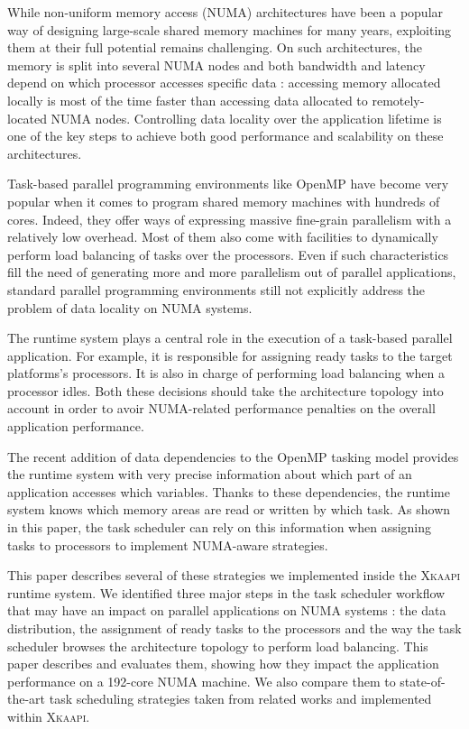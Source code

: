 \documentclass{Styles/llncs}
\newcommand{\kaapi}{\textsc{\mbox{Xkaapi}}\xspace}
\begin{document}
While non-uniform memory access (NUMA) architectures have been a popular way of designing large-scale shared memory machines for many years, exploiting them at their full potential remains challenging.
On such architectures, the memory is split into several NUMA nodes and
both bandwidth and latency depend on which processor accesses specific data :
accessing memory allocated locally is most of the time faster than accessing data allocated to remotely-located NUMA nodes.
Controlling data locality over the application lifetime is one of the key steps to
achieve both good performance and scalability on these architectures.

Task-based parallel programming environments like OpenMP have become very popular when it comes to program shared memory machines with hundreds of cores. Indeed, they offer ways of expressing massive fine-grain parallelism with a relatively low overhead. Most of them also come with facilities to dynamically perform load balancing of tasks over the processors. Even if such characteristics fill the need of generating more and more parallelism out of parallel applications, standard parallel programming environments still not explicitly address the problem of data locality on NUMA systems.

The runtime system plays a central role in the execution of a task-based parallel application.
For example, it is responsible for assigning ready tasks to the target platforms's processors. 
It is also in charge of performing load balancing when a processor idles.
Both these decisions should take the architecture topology into account in order to avoir NUMA-related performance penalties on the overall application performance.

The recent addition of data dependencies to the OpenMP tasking model provides the
runtime system with very precise information about which part of an application accesses which variables. 
Thanks to these dependencies, the runtime system knows which memory areas are read or written by which task. As shown in this paper, the task scheduler can rely on this information when assigning tasks to processors to implement NUMA-aware strategies.

This paper describes several of these strategies we implemented inside the \kaapi runtime system.
We identified three major steps in the task scheduler workflow that may have an impact on parallel applications on NUMA systems : the data distribution, the assignment of ready tasks to the processors and the way the task scheduler browses the architecture topology to perform load balancing.
This paper describes and evaluates them, showing how they impact the application performance on a 192-core NUMA machine.
We also compare them to state-of-the-art task scheduling strategies taken from related works and implemented within \kaapi.
\end{document}
